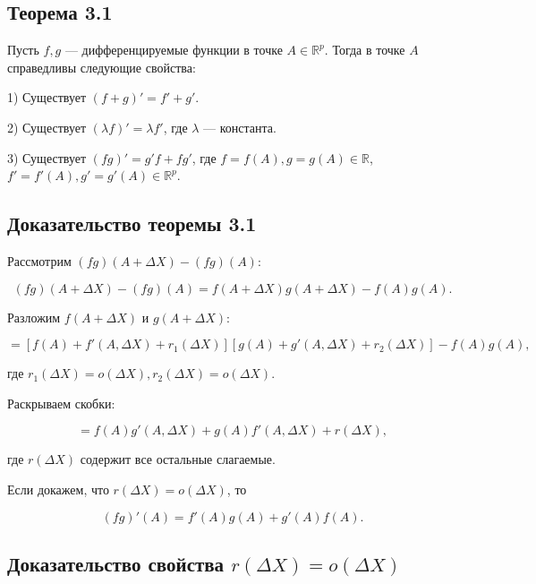 {\subsection*{Теорема 3.1}

Пусть \( f, g \) — дифференцируемые функции в точке \( A \in \mathbb{R}^p \). Тогда в точке \( A \) справедливы следующие свойства:  

1) Существует \( (f + g)' = f' + g' \). 

2) Существует \( (\lambda f)' = \lambda f' \), где \( \lambda \) — константа. 

3) Существует \( (fg)' = g'f + fg' \), где \( f = f(A), g = g(A) \in \mathbb{R} \), \( f' = f'(A), g' = g'(A) \in \mathbb{R}^p \).  

\subsection*{Доказательство теоремы 3.1}

Рассмотрим \( (fg)(A + \Delta X) - (fg)(A) \):



\[
(fg)(A + \Delta X) - (fg)(A) = f(A + \Delta X)g(A + \Delta X) - f(A)g(A).
\]



Разложим \( f(A + \Delta X) \) и \( g(A + \Delta X) \):



\[
= [f(A) + f'(A, \Delta X) + r_1(\Delta X)] [g(A) + g'(A, \Delta X) + r_2(\Delta X)] - f(A)g(A),
\]



где \( r_1(\Delta X) = o(\Delta X), r_2(\Delta X) = o(\Delta X). \)

Раскрываем скобки:



\[
= f(A)g'(A, \Delta X) + g(A)f'(A, \Delta X) + r(\Delta X),
\]



где \( r(\Delta X) \) содержит все остальные слагаемые.

Если докажем, что \( r(\Delta X) = o(\Delta X) \), то 



\[
(fg)'(A) = f'(A)g(A) + g'(A)f(A).
\]



\subsection*{Доказательство свойства \( r(\Delta X) = o(\Delta X) \)}

}

